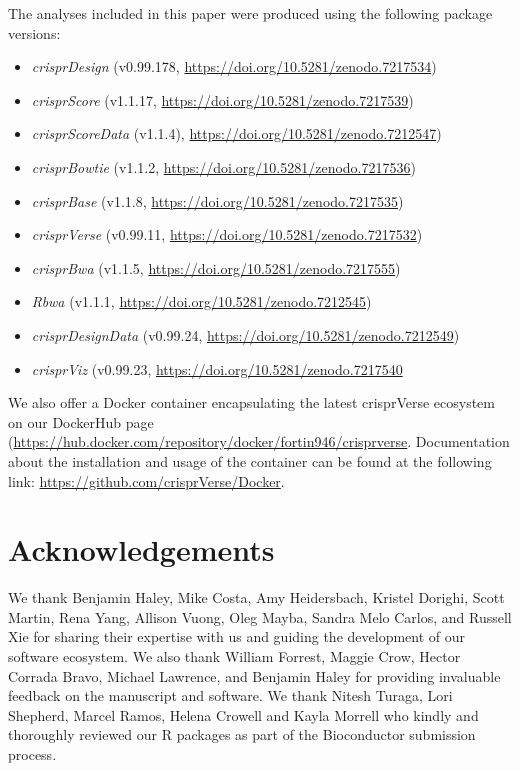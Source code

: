 \documentclass[pdftex,english,10pt]{article}
\begin{document}
{The analyses included in this paper were produced using the following package versions: 
\begin{itemize}
\item \textit{crisprDesign} (v0.99.178, \url{https://doi.org/10.5281/zenodo.7217534})
\item \textit{crisprScore} (v1.1.17, \url{https://doi.org/10.5281/zenodo.7217539})
\item \textit{crisprScoreData} (v1.1.4), \url{https://doi.org/10.5281/zenodo.7212547})
\item \textit{crisprBowtie} (v1.1.2, \url{https://doi.org/10.5281/zenodo.7217536})
\item \textit{crisprBase} (v1.1.8, \url{https://doi.org/10.5281/zenodo.7217535})
\item \textit{crisprVerse} (v0.99.11, \url{https://doi.org/10.5281/zenodo.7217532})
\item \textit{crisprBwa} (v1.1.5, \url{https://doi.org/10.5281/zenodo.7217555})
\item \textit{Rbwa} (v1.1.1, \url{https://doi.org/10.5281/zenodo.7212545})
\item \textit{crisprDesignData} (v0.99.24, \url{https://doi.org/10.5281/zenodo.7212549})
\item \textit{crisprViz} (v0.99.23, \url{https://doi.org/10.5281/zenodo.7217540}
\end{itemize}

We also offer a Docker container encapsulating the latest crisprVerse ecosystem on our DockerHub page (\url{https://hub.docker.com/repository/docker/fortin946/crisprverse}. 
Documentation about the installation and usage of the container can be found at the following link: \url{https://github.com/crisprVerse/Docker}.










%
%
%
%
%




\section*{Acknowledgements}

We thank Benjamin Haley, Mike Costa, Amy Heidersbach, Kristel Dorighi, Scott Martin, Rena Yang, Allison Vuong, Oleg Mayba, Sandra Melo Carlos, and Russell Xie for sharing their expertise with us and guiding the development of our software ecosystem. We also thank William Forrest, Maggie Crow, Hector Corrada Bravo, Michael Lawrence, and Benjamin Haley for providing invaluable feedback on the manuscript and software. We thank Nitesh Turaga, Lori Shepherd, Marcel Ramos, Helena Crowell and Kayla Morrell who kindly and thoroughly reviewed our R packages as part of the Bioconductor submission process.


}
\end{document}
